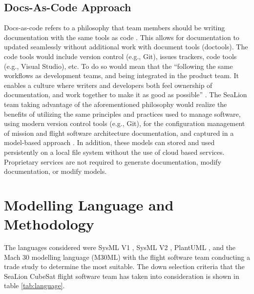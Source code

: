 \documentclass[journal,article,submit,pdftex,moreauthors]{Definitions/mdpi}
\begin{document}
\subsection{Docs-As-Code Approach}
Docs-as-code refers to a philosophy that team members should be writing documentation with the same tools as code \cite{ibm_mbse}.  This allows for documentation to updated seamlessly without additional work with document tools (doctools).  The code tools would include version control (e.g., Git), issues trackers, code tools (e.g., Visual Studio), etc.  To do so would mean that the “following the same workflows as development teams, and being integrated in the product team. It enables a culture where writers and developers both feel ownership of documentation, and work together to make it as good as possible” \cite{ibm_mbse}.  The SeaLion team taking advantage of the aforementioned philosophy would realize the benefits of utilizing the same principles and practices used to manage software, using modern version control tools (e.g., Git), for the configuration management of mission and flight software architecture documentation, and captured in a model-based approach \cite{ibm_mbse}.  In addition, these models can stored and used persistently on a local file system without the use of cloud based services.  Proprietary services are not required to generate documentation, modify documentation, or modify models.

\section{Modelling Language and Methodology}
The languages considered were SysML V1 \cite{sys_ml}, SysML V2 \cite{sys_ml2}, PlantUML \cite{plantuml}, and the Mach 30 modelling language (M30ML) \cite{mach30_git} with the flight software team conducting a trade study to determine the most suitable.  The down selection criteria that the SeaLion CubeSat flight software team has taken into consideration is shown in table \ref{tab:language}.
\end{document}
